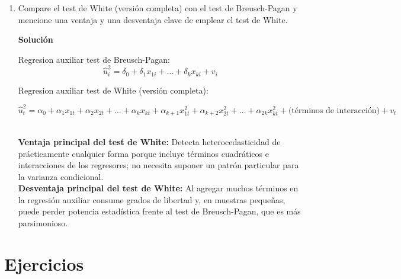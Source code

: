 \documentclass[10pt,a4paper]{article}
\begin{document}
\begin{enumerate}
{\textbf{Consecuencias de las violaciones}
\begin{itemize}
  \item \emph{Instrumento débil} (falla de relevancia): el estimador IV se sesga hacia MCO y sus 
        varianzas se inflan, debilitando la inferencia.
  \item \emph{Instrumento inválido} (falla de exogeneidad): el estimador IV se vuelve inconsistente; 
        el sesgo puede superar al de MCO.
\end{itemize}}

\item  Compare el test de White (versión completa) con el test de Breusch-Pagan y mencione una ventaja y una desventaja clave de emplear el test de White.\\
{\color{blue}\textbf{Solución}

Regresion auxiliar test de  Breusch-Pagan: 
\[
\hat u_i^{2} = \delta_0 + \delta_1 x_{1i} + \dots + \delta_k x_{ki} + v_i
\]

Regresion auxiliar test de  White (versión completa): 

\[\hat u_t^{2}
= \alpha_0
+ \alpha_1 x_{1t}
+ \alpha_2 x_{2t}
+ \dots
+ \alpha_k x_{kt}
+ \alpha_{k+1} x_{1t}^2
+ \alpha_{k+2} x_{2t}^2
+ \dots
+ \alpha_{2k} x_{kt}^2
+ \text{(términos de interacción)}
+ v_t
\]

\\
\textbf{Ventaja principal del test de White:}
Detecta heterocedasticidad de prácticamente cualquier forma porque incluye términos cuadráticos e interacciones de los regresores; no necesita suponer un patrón particular para la varianza condicional.
\\
\textbf{Desventaja principal del test de White:}
Al agregar muchos términos en la regresión auxiliar consume grados de libertad y, en muestras pequeñas, puede perder potencia estadística frente al test de Breusch-Pagan, que es más parsimonioso.}

\end{enumerate}

\section{Ejercicios }
\end{document}
